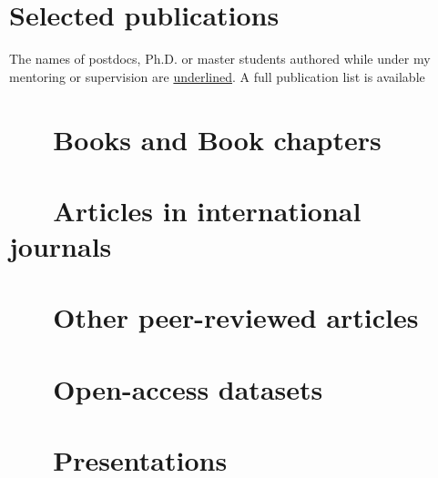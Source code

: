 \documentclass[%
               doublesided,
               paper=a4,
               fontsize=10pt
              ]{my-resume}
\begin{document}
\clearpage
\clearpage

\pagestyle{empty}

\section[\faAreaChart]{Selected publications}
The names of postdocs, Ph.D. or master students authored while under my mentoring or supervision are \underline{underlined}. A full publication list is available 

\nocite{*}
\section{\faBook \ \ \ Books and Book chapters}
\printbibliography[type=book,heading=none]
\section{\faFileTextO \ \ \  Articles in international journals}
\printbibliography[type=article,heading=none]
\section{\faFileTextO \ \ \  Other peer-reviewed articles}
\printbibliography[type=periodical,heading=none]
\section{\faFileTextO \ \ \  Open-access datasets}
\printbibliography[type=dataset,heading=none]
\section{\faFileTextO \ \ \  Presentations}
\printbibliography[type=misc,heading=none]

\end{document}
